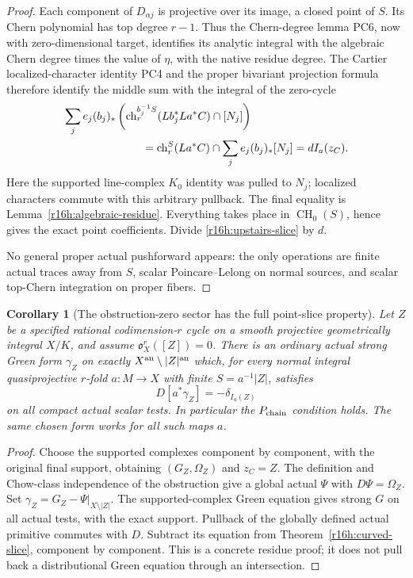 \documentclass[11pt,a4paper]{article}
\newtheorem{corollary}[theorem]{Corollary}
\theoremstyle{definition}
\theoremstyle{remark}
\numberwithin{equation}{section}
\begin{document}
\begin{proof}
Each component of $D_{\alpha j}$ is projective over its image, a
closed point of $S$. Its Chern polynomial has top degree $r-1$.
Thus the Chern-degree lemma PC6, now with zero-dimensional
target, identifies its analytic integral with the algebraic Chern
degree times the value of $\eta$, with the native residue degree.
The Cartier localized-character identity PC4 and the proper
bivariant projection formula therefore identify the middle sum with
the integral of the zero-cycle
\begin{align*}
 &\sum_j e_j(b_j)_*\left(
           \operatorname{ch}^{b_j^{-1}S}_r(Lb_j^*La^*C)\cap[N_j]\right)\\
 &\hspace{25mm}=\operatorname{ch}_r^S(La^*C)\cap
                    \sum_j e_j(b_j)_*[N_j]
       =d I_a(z_C).
\end{align*}
Here the supported line-complex $K_0$ identity was pulled to $N_j$;
localized characters commute with this arbitrary pullback. The final
equality is Lemma~\ref{r16h:algebraic-residue}. Everything takes place
in $\operatorname{CH}_0(S)$, hence gives the exact point coefficients.
Divide \eqref{r16h:upstairs-slice} by $d$.

No general proper actual pushforward appears: the only operations are
finite actual traces away from $S$, scalar Poincare--Lelong on normal
sources, and scalar top-Chern integration on proper fibers.
\end{proof}

\begin{corollary}[The obstruction-zero sector has the full point-slice property]
\label{r16h:P}
Let $Z$ be a specified rational codimension-$r$ cycle on a smooth
projective geometrically integral $X/K$, and assume
$\mathfrak o_X^r([Z])=0$. There is an ordinary actual strong Green form
$\gamma_Z$ on exactly $X^{\rm an}\setminus|Z|^{\rm an}$ which, for
every normal integral quasiprojective $r$-fold $a:M\to X$ with finite
$S=a^{-1}|Z|$, satisfies
\[
             D[a^*\gamma_Z]=-\delta_{I_a(Z)}
 \tag{H16.7}\label{r16h:P-eq}
\]
on all compact actual scalar tests. In particular the
$P_{\rm chain}$ condition holds. The same chosen form works for all
such maps $a$.
\end{corollary}

\begin{proof}
Choose the supported complexes component by component, with
the original final support, obtaining $(G_Z,\Omega_Z)$ and $z_C=Z$.
The definition and Chow-class independence of the obstruction
give a global actual $\Psi$ with $D\Psi=\Omega_Z$. Set
$\gamma_Z=G_Z-\Psi|_{X\setminus|Z|}$. The supported-complex
Green equation gives strong $G$ on all actual tests, with the exact
support. Pullback of the globally defined actual primitive commutes
with $D$. Subtract its equation from
Theorem~\ref{r16h:curved-slice}, component by component.
This is a concrete residue proof; it does not pull back a distributional
Green equation through an intersection.
\end{proof}
\end{document}
